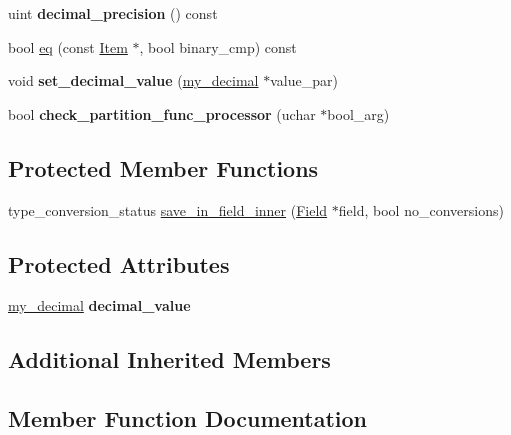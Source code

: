 \begin{DoxyCompactItemize}
\mbox{\label{classItem__decimal_ad7609f5336e0e01ecd00fbd19b56c64c}} 
uint {\bfseries decimal\+\_\+precision} () const
\item 
bool \mbox{\hyperlink{classItem__decimal_a4aa9e47eb7b28550f00439b40a5fdf83}{eq}} (const \mbox{\hyperlink{classItem}{Item}} $\ast$, bool binary\+\_\+cmp) const
\item 
\mbox{\label{classItem__decimal_a3ab1030161ced09dba2da64c9036dcce}} 
void {\bfseries set\+\_\+decimal\+\_\+value} (\mbox{\hyperlink{classmy__decimal}{my\+\_\+decimal}} $\ast$value\+\_\+par)
\item 
\mbox{\label{classItem__decimal_a5b1c68e72c1facc2ebd0520ffaf2697d}} 
bool {\bfseries check\+\_\+partition\+\_\+func\+\_\+processor} (uchar $\ast$bool\+\_\+arg)
\end{DoxyCompactItemize}
\subsection*{Protected Member Functions}
\begin{DoxyCompactItemize}
\item 
type\+\_\+conversion\+\_\+status \mbox{\hyperlink{classItem__decimal_acad1cbacc238128c33dcb3a5928dad75}{save\+\_\+in\+\_\+field\+\_\+inner}} (\mbox{\hyperlink{classField}{Field}} $\ast$field, bool no\+\_\+conversions)
\end{DoxyCompactItemize}
\subsection*{Protected Attributes}
\begin{DoxyCompactItemize}
\item 
\mbox{\label{classItem__decimal_a855f79ede2c5f0aeb3a738b1ca4dc621}} 
\mbox{\hyperlink{classmy__decimal}{my\+\_\+decimal}} {\bfseries decimal\+\_\+value}
\end{DoxyCompactItemize}
\subsection*{Additional Inherited Members}


\subsection{Member Function Documentation}
\mbox{\label{classItem__decimal_a4aa9e47eb7b28550f00439b40a5fdf83}} 

